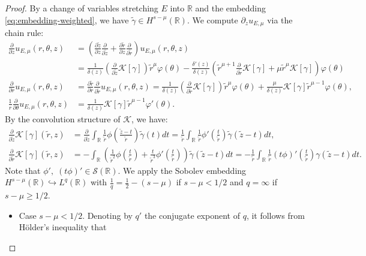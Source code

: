 \documentclass[10pt,a4paper]{amsart}
\newcommand{\R}{\mathbb{R}}
\newcommand{\Sw}{\mathcal{S}}
\renewcommand{\d}{\delta}
\newcommand{\g}{\gamma}
\newcommand{\p}{\partial}
\renewcommand{\t}{\theta}
\newcommand{\vf}{\varphi}
\begin{document}
        \begin{proof}
            By a change of variables stretching $E$ into $\R$ and the embedding \eqref{eq:embedding-weighted}, we have $\widetilde{\g}\in H^{s-\mu}(\R)$. We compute $\p_z u_{E,\mu}$ via the chain rule:
            \begin{align*}
                \frac{\p}{\p z}u_{E,\mu}(r,\t,z)&= \left(\frac{\p \widetilde{z}}{\p z}\frac{\p}{\p \widetilde{z}}+\frac{\p \widetilde{r}}{\p z}\frac{\p}{\p \widetilde{r}}\right) u_{E,\mu}(r,\t,z)\\
                &= \frac{1}{\d(z)}\left(\frac{\p}{\p \widetilde{z}}\mathcal{K}[\g]\right)\widetilde{r}^{\mu}\vf(\t)-\frac{\d'(z)}{\d(z)} \left(\widetilde{r}^{\mu+1} \frac{\p}{\p \widetilde{r}}\mathcal{K}[\g]+\mu \widetilde{r}^{\mu}\mathcal{K}[\g]\right) \vf(\t)\\
                \frac{\p}{\p r} u_{E,\mu}(r,\t,z) &= \frac{\p \widetilde{r}}{\p r}\frac{\p}{\p \widetilde{r}} u_{E,\mu}(r,\t,z)=\frac{1}{\d(z)}\left(\frac{\p}{\p \widetilde{r}}\mathcal{K}[\g]\right)\widetilde{r}^{\mu}\vf(\t)+\frac{\mu}{\d(z)} \mathcal{K}[\g]\widetilde{r}^{\mu-1}\vf(\t),\\
                \frac{1}{r} \frac{\p}{\p \t} u_{E,\mu}(r,\t,z) &= \frac{1}{\d(z)}\mathcal{K}[\g]\widetilde{r}^{\mu-1}\vf'(\t).
            \end{align*}
            By the convolution structure of $\mathcal{K}$, we have:
            \begin{align*}
                \frac{\p}{\p \widetilde{z}}\mathcal{K}[\g](\widetilde{r},z)& = \frac{\p}{\p \widetilde{z}}\int_\R \frac{1}{\widetilde{r}}\phi(\frac{\widetilde{z}-t}{\widetilde{r}})\widetilde{\g}(t)dt=\frac{1}{\widetilde{r}}\int_\R \frac{1}{\widetilde{r}}\phi'(\frac{t}{\widetilde{r}})\widetilde{\g}(\widetilde{z}-t) dt,\\
                \frac{\p}{\p \widetilde{r}}\mathcal{K}[\g](\widetilde{r},z)&= -\int_\R \left(\frac{1}{\widetilde{r}^2}\phi(\frac{t}{\widetilde{r}})+\frac{t}{\widetilde{r}^3}\phi'(\frac{t}{\widetilde{r}})\right)\widetilde{\g}(\widetilde{z}-t)dt=-\frac{1}{\widetilde{r}}\int_\R \frac{1}{\widetilde{r}}(t\phi)'(\frac{t}{\widetilde{r}})\g(\widetilde{z}-t)dt.
            \end{align*}
            Note that $\phi',\;(t\phi)'\in \Sw(\R)$. We apply the Sobolev embedding $H^{s-\mu}(\R)\hookrightarrow L^q(\R)$ with $\frac{1}{q}=\frac{1}{2}-(s-\mu)$ if $s-\mu<1/2$ and $q=\infty$ if $s-\mu\geq 1/2$.
            \begin{itemize}
                \item Case $s-\mu <1/2$. Denoting by $q'$ the conjugate exponent of $q$, it follows from H\"older's inequality that

\end{itemize}
\end{proof}
\end{document}
